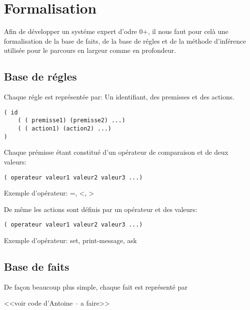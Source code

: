 \chapter{Formalisation}  

Afin de développer un systéme expert d'odre 0+, il nous faut pour celà une formalisation de la base de faits, de la base de régles et de la méthode d'inférence utilisée pour le parcours en largeur comme en profondeur.

 \section{Base de régles}

Chaque régle est représentée par: Un identifiant, des premisses et des actions.

\begin{lstlisting}
( id
	( ( premisse1) (premisse2) ...)
	( ( action1) (action2) ...)
)
\end{lstlisting}

Chaque prémisse étant constitué d'un opérateur de comparaison et de deux valeurs:

\begin{lstlisting}
( operateur valeur1 valeur2 valeur3 ...)
\end{lstlisting}

Exemple d'opérateur: =, <, >

De même les actions sont définis par un opérateur et des valeurs:
\begin{lstlisting}
( operateur valeur1 valeur2 valeur3 ...)
\end{lstlisting}

Exemple d'opérateur: set, print-message, ask

 \section{Base de faits}

De façon beaucoup plus simple, chaque fait est représenté par

<<voir code d'Antoine -- a faire>>